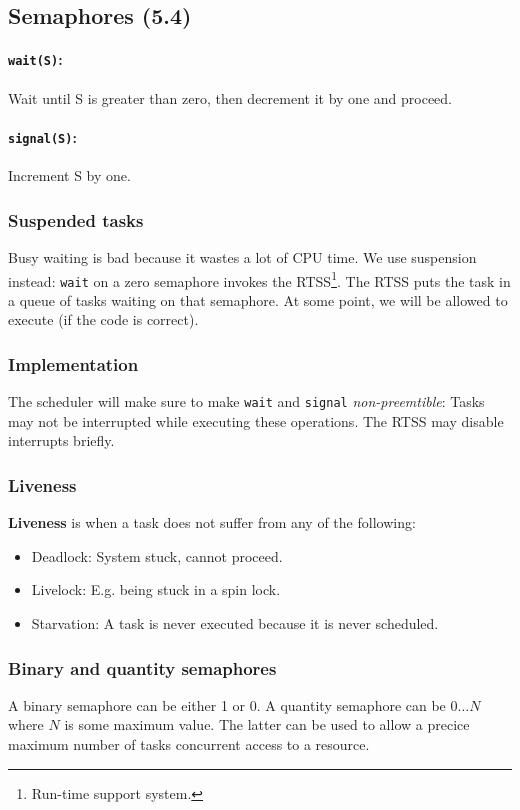 \documentclass[a4paper, 12pt]{article}
\begin{document}
\subsection{Semaphores (5.4)}
\paragraph{\texttt{wait(S)}:} Wait until S is greater than zero, then decrement it by one and proceed.
\paragraph{\texttt{signal(S)}:} Increment S by one.

\subsubsection{Suspended tasks}
Busy waiting is bad because it wastes a lot of CPU time. We use suspension instead: \texttt{wait} on a zero semaphore invokes the RTSS\footnote{Run-time support system.}. The RTSS puts the task in a queue of tasks waiting on that semaphore. At some point, we will be allowed to execute (if the code is correct).

\subsubsection{Implementation}
The scheduler will make sure to make \texttt{wait} and \texttt{signal} \emph{non-preemtible}: Tasks may not be interrupted while executing these operations. The RTSS may disable interrupts briefly.

\subsubsection{Liveness}
\textbf{Liveness} is when a task does not suffer from any of the following:
\begin{itemize}
	\item Deadlock: System stuck, cannot proceed.
	\item Livelock: E.g. being stuck in a spin lock.
	\item Starvation: A task is never executed because it is never scheduled.
\end{itemize}

\subsubsection{Binary and quantity semaphores}
A binary semaphore can be either 1 or 0. A quantity semaphore can be \(0 \dots N\) where \(N\) is some maximum value. The latter can be used to allow a precice maximum number of tasks concurrent access to a resource.
\end{document}
